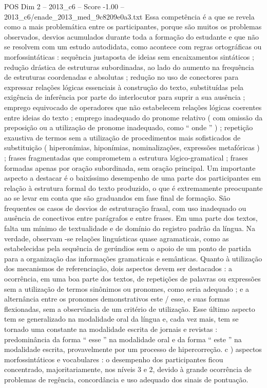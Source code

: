 \begin{textsample}{POS Dim 2 – 2013\_c6 – Score -1.00 – 2013\_c6/enade\_2013\_med\_9c8209e0a3.txt}
Essa competência é a que se revela como a mais problemática entre os participantes, porque são muitos os problemas observados, desvios acumulados durante toda a formação do estudante e que não se resolvem com um estudo autodidata, como acontece com regras ortográficas ou morfossintáticas : sequência justaposta de ideias sem encaixamentos sintáticos ; redução drástica de estruturas subordinadas, ao lado do aumento na frequência de estruturas coordenadas e absolutas ; redução no uso de conectores para expressar relações lógicas essenciais à construção do texto, substituídas pela exigência de inferência por parte do interlocutor para suprir a sua ausência ; emprego equivocado de operadores que não estabelecem relações lógicas coerentes entre ideias do texto ; emprego inadequado do pronome relativo ( com omissão da preposição ou a utilização de pronome inadequado, como “ onde ” ) ; repetição exaustiva de termos sem a utilização de procedimentos mais sofisticados de substituição ( hiperonímias, hiponímias, nominalizações, expressões metafóricas ) ; frases fragmentadas que comprometem a estrutura lógico-gramatical ; frases formadas apenas por oração subordinada, sem oração principal.
Um importante aspecto a destacar é o baixíssimo desempenho de uma parte dos participantes em relação à estrutura formal do texto produzido, o que é extremamente preocupante ao se levar em conta que são graduandos em fase final de formação.
São frequentes os casos de desvios de estruturação frasal, com uso inadequado ou ausência de conectivos entre parágrafos e entre frases.
Em uma parte dos textos, falta um mínimo de textualidade e de domínio do registro padrão da língua.
Na verdade, observam -se relações linguísticas quase agramaticais, como as estabelecidas pela sequência de gerúndios sem o apoio de um ponto de partida para a organização das informações gramaticais e semânticas.
Quanto à utilização dos mecanismos de referenciação, dois aspectos devem ser destacados : a ocorrência, em uma boa parte dos textos, de repetições de palavras ou expressões sem a utilização de termos sinônimos ou pronomes, como seria adequado ; e a alternância entre os pronomes demonstrativos este / esse, e suas formas flexionadas, sem a observância de um critério de utilização.
Esse último aspecto tem se generalizado na modalidade oral da língua e, cada vez mais, tem se tornado uma constante na modalidade escrita de jornais e revistas : predominância da forma “ esse ” na modalidade oral e da forma “ este ” na modalidade escrita, provavelmente por um processo de hipercorreção. c ) aspectos morfossintáticos e vocabulares : o desempenho dos participantes ficou concentrado, majoritariamente, nos níveis 3 e 2, devido à grande ocorrência de problemas de regência, concordância e uso adequado dos sinais de pontuação.

\end{textsample}
